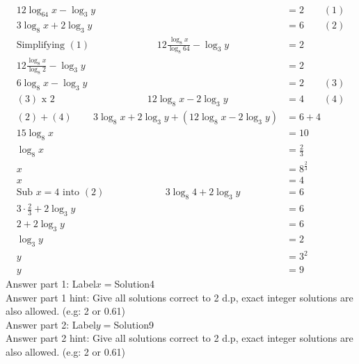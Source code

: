 \documentclass{article}
\begin{document}
\\[-35pt]\begin{align*}
12\log_{64}x-\log_{3}y&=2\qquad (1)\\[2pt]
3\log_{8}x+2\log_{3}y&=6\qquad (2)\\[2pt]
\text{Simplifying}\,\,(1)\hspace{83pt}12\displaystyle\frac{\log_{8}x}{\log_{8}64}-\log_{3}y&=2\\[2pt]
12\displaystyle\frac{\log_{8}x}{\log_{8}2}-\log_{3}y&=2\\[2pt]
6\log_{8}x-\log_{3}y&=2\qquad(3)\\[2pt]
(3)\,\,\text{x}\,\,2\hspace{114pt} 12\log_{8}x-2\log_{3}y&=4\qquad (4)\\[2pt]
(2)+(4)\hspace{26pt}3\log_{8}x+2\log_{3}y+(12\log_{8}x-2\log_{3}y)&=6+4\\[2pt]
15\log_{8}x&=10\\[2pt]
\log_{8}x&=\displaystyle\frac{2}{3}\\[2pt]
x&=8^{\frac{2}{3}}\\[2pt]
x&=4\\[12pt]
\text{Sub}\,\,x=4\,\,\text{into}\,\,(2)\hspace{75pt}3\log_{8}4+2\log_{3}y&=6\\[2pt]
3\!\cdot\!\frac{2}{3}+2\log_{3}y&=6\\[2pt]
2+2\log_{3}y&=6\\[2pt]
\log_{3}y&=2\\[2pt]
y&=3^2\\[2pt]
y&=9
\end{align*}
Answer part 1: \hspace{10pt}Label\hspace{10pt}$x=$\hspace{10pt}Solution\hspace{10pt}4\\
Answer part 1 hint: \hspace{15pt}Give all solutions correct to 2 d.p, exact integer solutions are also allowed. (e.g: 2 or 0.61)\\
Answer part 2: \hspace{10pt}Label\hspace{10pt}$y=$\hspace{10pt}Solution\hspace{10pt}9\\
Answer part 2 hint: \hspace{15pt}Give all solutions correct to 2 d.p, exact integer solutions are also allowed. (e.g: 2 or 0.61)\\
\\[4pt]
\\[2pt]
\end{document}
